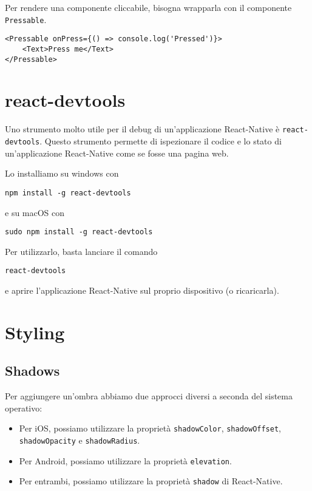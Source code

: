 \documentclass[12pt]{article}
\begin{document}
Per rendere una componente cliccabile, bisogna
wrapparla con il componente \texttt{Pressable}.
\begin{highlight}
\begin{verbatim}
<Pressable onPress={() => console.log('Pressed')}>
    <Text>Press me</Text>
</Pressable>
\end{verbatim}
\end{highlight}


\section{react-devtools}
Uno strumento molto utile per il debug di un'applicazione React-Native è
\texttt{react-devtools}. Questo strumento permette di ispezionare il codice
e lo stato di un'applicazione React-Native come se fosse una pagina web.

Lo installiamo su windows con 
\begin{highlight}
\begin{verbatim}
npm install -g react-devtools
\end{verbatim}  
\end{highlight}
e su macOS con
\begin{highlight}
\begin{verbatim}
sudo npm install -g react-devtools
\end{verbatim}
\end{highlight}

Per utilizzarlo, basta lanciare il comando
\begin{highlight}
\begin{verbatim}
react-devtools
\end{verbatim}
\end{highlight}
e aprire l'applicazione React-Native sul proprio dispositivo (o ricaricarla).





\section{Styling}
\subsection{Shadows}
Per aggiungere un'ombra abbiamo due approcci diversi a seconda del sistema operativo:
\begin{itemize}
\item Per iOS, possiamo utilizzare la proprietà \texttt{shadowColor}, \texttt{shadowOffset}, \texttt{shadowOpacity} e \texttt{shadowRadius}.
\item Per Android, possiamo utilizzare la proprietà \texttt{elevation}.
\item Per entrambi, possiamo utilizzare la proprietà \texttt{shadow} di React-Native.
\end{itemize}
\end{document}
